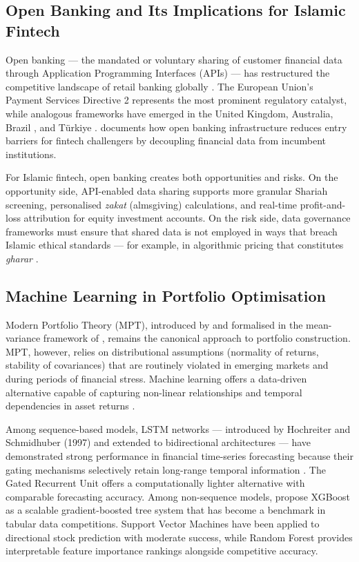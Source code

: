 \subsection{Open Banking and Its Implications for Islamic Fintech}
\label{subsec:open_banking}

Open banking — the mandated or voluntary sharing of customer financial data
through Application Programming Interfaces (APIs) — has restructured the
competitive landscape of retail banking globally
\citep{briones2022open, borgogno2019data}. The European Union's Payment
Services Directive 2 \citep{eu2015directive} represents the most prominent
regulatory catalyst, while analogous frameworks have emerged in the United
Kingdom, Australia, Brazil \citep{brazil2020open}, and Türkiye
\citep{cbfo2023fintech}. \citet{cbi2023global} documents how open banking
infrastructure reduces entry barriers for fintech challengers by decoupling
financial data from incumbent institutions.

For Islamic fintech, open banking creates both opportunities and risks. On the
opportunity side, API-enabled data sharing supports more granular Shariah
screening, personalised \textit{zakat} (almsgiving) calculations, and
real-time profit-and-loss attribution for equity investment accounts. On the
risk side, data governance frameworks must ensure that shared data is not
employed in ways that breach Islamic ethical standards — for example, in
algorithmic pricing that constitutes \textit{gharar} \citep{cengiz2023fintech}.

\subsection{Machine Learning in Portfolio Optimisation}
\label{subsec:ml_portfolio}

Modern Portfolio Theory (MPT), introduced by \citet{bodie1984nominal} and
formalised in the mean-variance framework of \citeauthor{chen2016xgboost},
remains the canonical approach to portfolio construction. MPT, however, relies
on distributional assumptions (normality of returns, stability of
covariances) that are routinely violated in emerging markets and during periods
of financial stress. Machine learning offers a data-driven alternative capable
of capturing non-linear relationships and temporal dependencies in asset
returns \citep{broby2022predictive}.

Among sequence-based models, LSTM networks — introduced by Hochreiter and
Schmidhuber (1997) and extended to bidirectional architectures — have
demonstrated strong performance in financial time-series forecasting because
their gating mechanisms selectively retain long-range temporal information
\citep{azuaje2006mining}. The Gated Recurrent Unit \citep{cho2014learning}
offers a computationally lighter alternative with comparable forecasting
accuracy. Among non-sequence models, \citet{chen2016xgboost} propose
XGBoost as a scalable gradient-boosted tree system that has become a benchmark
in tabular data competitions. Support Vector Machines \citep{cortes1995support}
have been applied to directional stock prediction with moderate success, while
Random Forest \citep{azuaje2006mining} provides interpretable feature
importance rankings alongside competitive accuracy.

